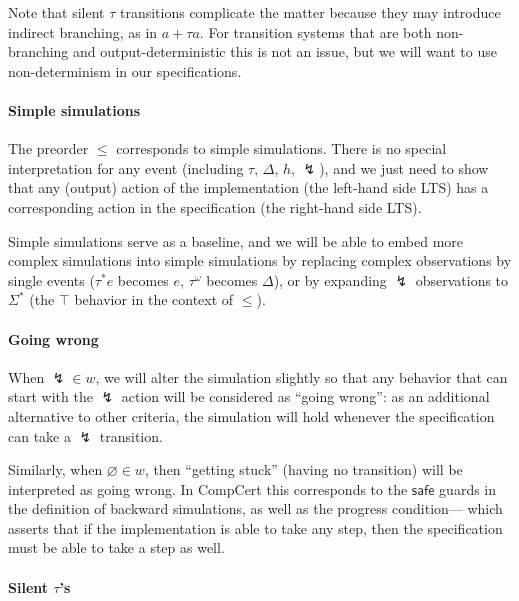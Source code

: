 \documentclass[11pt]{article}
\begin{document}
Note that silent $\tau$ transitions complicate the matter
because they may introduce indirect branching,
as in $a + \tau a$.
For transition systems that are both non-branching and output-deterministic
this is not an issue,
but we will want to use non-determinism in our specifications.


\paragraph{Simple simulations} %

The preorder $\le$
corresponds to simple simulations.
There is no special interpretation for any event
(including $\tau$, $\Delta$, $h$, $\lightning$),
and we just need to show that any (output) action of the implementation
(the left-hand side LTS)
has a corresponding action in the specification
(the right-hand side LTS).

Simple simulations serve as a baseline,
and we will be able to embed more complex simulations
into simple simulations
by replacing complex observations by single events
($\tau^*e$ becomes $e$, $\tau^\omega$ becomes $\Delta$),
or by expanding $\lightning$ observations to $\Sigma^*$
(the $\top$ behavior in the context of $\le$).


\paragraph{Going wrong} %

When $\lightning \in w$,
we will alter the simulation slightly
so that any behavior that can start with the $\lightning$ action
will be considered as ``going wrong'':
as an additional alternative to other criteria,
the simulation will hold whenever
the specification can take a $\lightning$ transition.

Similarly, when $\varnothing \in w$,
then ``getting stuck'' (having no transition)
will be interpreted as going wrong.
In CompCert this corresponds to the $\mathsf{safe}$
guards in the definition of backward simulations,
as well as the progress condition---%
which asserts that if the implementation is able to take any step,
then the specification must be able to take a step as well.


\paragraph{Silent $\tau$'s} %
\end{document}
